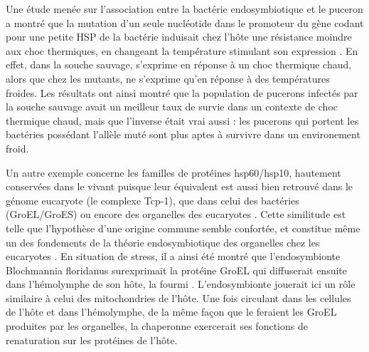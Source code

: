 Une étude menée sur l'association entre la bactérie endosymbiotique  et le puceron  a montré que la mutation d'un seule nucléotide dans le promoteur du gène  codant pour une petite HSP de la bactérie induisait chez l'hôte une résistance moindre aux choc thermiques, en changeant la température stimulant son expression \cite{dunbar2007}.
En effet, dans la souche sauvage,  s'exprime en réponse à un choc thermique chaud, alors que chez les mutants,  ne s'exprime qu'en réponse à des températures froides.
Les résultats ont ainsi montré que la population de pucerons infectés par la souche sauvage avait un meilleur taux de survie dans un contexte de choc thermique chaud, mais que l'inverse était vrai aussi : les pucerons qui portent les bactéries possédant l'allèle muté sont plus aptes à survivre dans un environement froid.

Un autre exemple concerne les familles de protéines hsp60/hsp10, hautement conservées dans le vivant puisque leur équivalent est aussi bien retrouvé dans le génome eucaryote (le complexe Tcp-1), que dans celui des bactéries (GroEL/GroES) ou encore des organelles des eucaryotes \cite{gupta1995}.
Cette similitude est telle que l'hypothèse d'une origine commune semble confortée, et constitue même un des fondements de la théorie endosymbiotique des organelles chez les eucaryotes \cite{gupta1995}.
En situation de stress, il a ainsi été montré que l'endosymbionte Blochmannia floridanus surexprimait la protéine GroEL qui diffuserait ensuite dans l’hémolymphe de son hôte, la fourmi  \cite{stoll2009, feldhaar2011}.
L'endosymbionte jouerait ici un rôle similaire à celui des mitochondries de l'hôte.
Une fois circulant dans les cellules de l'hôte et dans l'hémolymphe, de la même façon que le feraient les GroEL produites par les organelles, la chaperonne exercerait ses fonctions de renaturation sur les protéines de l'hôte.

